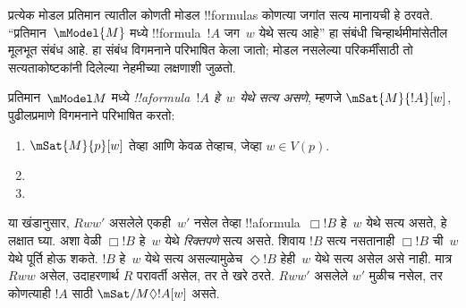 \documentclass[../../../include/open-logic-section]{subfiles}
\begin{document}


प्रत्येक मोडल प्रतिमान त्यातील कोणती मोडल !!{formula}s कोणत्या
जगांत सत्य मानायची हे ठरवते. ``प्रतिमान~$\mModel{M}$ मध्ये
!!{formula}~$!A$ जग~$w$ येथे सत्य आहे'' हा संबंधी
चिन्हार्थमीमांसेतील मूलभूत संबंध आहे. हा संबंध विगमनाने
परिभाषित केला जातो; मोडल नसलेल्या परिकर्मींसाठी तो
सत्यताकोष्टकांनी दिलेल्या नेहमीच्या लक्षणाशी जुळतो.

\begin{defn}
  प्रतिमान~$\mModel M$ मध्ये \emph{!!a{formula}~$!A$ हे~$w$ येथे
  सत्य असणे}, म्हणजे $\mSat{M}{!A}[w]$, पुढीलप्रमाणे
  विगमनाने परिभाषित करतो:
  \begin{enumerate}
  \item $\mSat{M}{p}[w]$ तेव्हा आणि केवळ तेव्हाच, जेव्हा $w \in V(p)$.
  \item{}
  \item{}
  \end{enumerate}
\end{defn}

 या खंडानुसार, $Rww'$ असलेले
एकही~$w'$ नसेल तेव्हा !!a{formula}~$\Box !B$ हे~$w$ येथे
सत्य असते, हे लक्षात घ्या. अशा वेळी $\Box !B$ हे~$w$ येथे
\emph{रिक्तपणे} सत्य असते. शिवाय $!B$ सत्य नसतानाही
$\Box !B$ ची~$w$ येथे पूर्ति होऊ शकते. $!B$ हे~$w$ येथे
सत्य असल्यामुळेच $\Diamond !B$ हेही~$w$ येथे सत्य असेल
असे नाही. मात्र $Rww$ असेल, उदाहरणार्थ $R$ परावर्ती असेल,
तर ते खरे ठरते. $Rww'$ असलेले $w'$ मुळीच नसेल, तर कोणत्याही
$!A$ साठी $\mSat/{M}{\Diamond !A}[w]$ असते.
\end{document}
